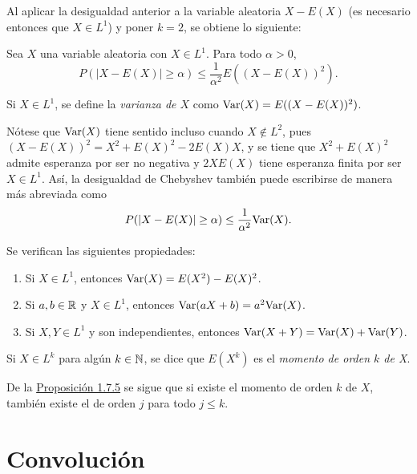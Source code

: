 \documentclass[a4paper, 11pt, extrafontsizes]{memoir}
\begin{document}
Al aplicar la desigualdad anterior a la variable aleatoria $X - E(X)$ (es necesario entonces que $X \in L^1$) y poner $k = 2$, se obtiene lo siguiente:

\begin{corollary}
    Sea $X$ una variable aleatoria con $X \in L^1$. Para todo $\alpha > 0$,
    \[P(|X-E(X)| \geq \alpha) \leq \frac{1}{\alpha^2}E((X-E(X))^2).\]
\end{corollary}

\begin{definition}
    Si $X \in L^1$, se define la \emph{varianza de $X$} como $\textup{Var}(X) = E((X-E(X))^2)$.
\end{definition}

Nótese que $\textup{Var}(X)$ tiene sentido incluso cuando $X \not\in L^2$, pues $(X-E(X))^2 = X^2+E(X)^2-2E(X)X$, y se tiene que $X^2 +E(X)^2$ admite esperanza por ser no negativa y $2XE(X)$ tiene esperanza finita por ser $X \in L^1$. Así, la desigualdad de Chebyshev también puede escribirse de manera más abreviada como
\[P(|X-E(X)| \geq \alpha) \leq \frac{1}{\alpha^2}\textup{Var}(X).\]


\begin{proposition}
    Se verifican las siguientes propiedades:
    \begin{enumerate}
        \item Si $X \in L^1$, entonces $\textup{Var}(X) = E(X^2) - E(X)^2$.
        \item Si $a, b \in \mathbb R$ y $X \in L^1$, entonces $\textup{Var}(aX+b) = a^2 \textup{Var}(X)$.
        \item Si $X,Y \in L^1$ y son independientes, entonces $\textup{Var}(X+Y) =\textup{Var}(X)+\textup{Var}(Y)$.
    \end{enumerate}
\end{proposition}


\begin{definition}
    Si $X \in L^k$ para algún $k \in \mathbb N$, se dice que $E(X^k)$ es el \emph{momento de orden $k$ de X}.
\end{definition}

De la \hyperref[pro:1.6.5]{\color{gray}Proposición 1.7.5} se sigue que si existe el momento de orden $k$ de $X$, también existe el de orden $j$ para todo $j \leq k$.



\chapter{Convolución}
\end{document}
